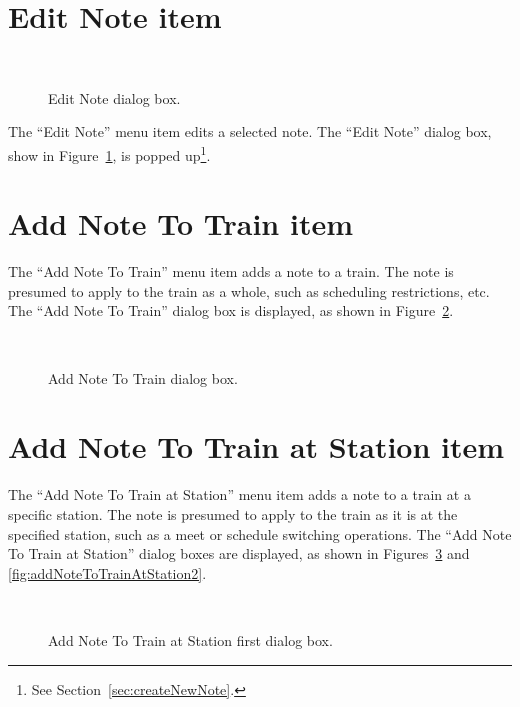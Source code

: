 \section{Edit Note item} 

\begin{figure}
\begin{centering}
\\
\caption{Edit Note dialog box.}
\label{fig:editNote}
\end{centering}
\end{figure} The ``Edit Note'' menu item edits a selected note. The
``Edit Note'' dialog box, show in Figure~\ref{fig:editNote}, is popped
up\footnote{See Section~\ref{sec:createNewNote}.}.



\section{Add Note To Train item} 
\label{sect:addntotr}

The ``Add Note To Train'' menu item adds a note to a train.  The note is
presumed to apply to the train as a whole, such as scheduling
restrictions, etc.  The ``Add Note To Train'' dialog box is displayed,
as shown in Figure~\ref{fig:addNoteToTrain}.

\begin{figure}
\begin{centering}
\\
\caption{Add Note To Train dialog box.}
\label{fig:addNoteToTrain}
\end{centering}
\end{figure}

\section{Add Note To Train at Station item}
\label{sect:addntotrsta}

The ``Add Note To Train at Station'' menu item adds a note to a train
at a specific station.  The note is presumed to apply to the train as
it is at the specified station, such as a meet or schedule switching
operations.  The ``Add Note To Train at Station'' dialog boxes are
displayed, as shown in Figures~\ref{fig:addNoteToTrainAtStation1} and
\ref{fig:addNoteToTrainAtStation2}.

\begin{figure} 
\begin{centering} 
\\
\caption{Add Note To Train at Station first dialog box.} 
\label{fig:addNoteToTrainAtStation1}
\end{centering} 
\end{figure}

